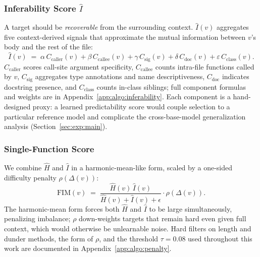 \subsubsection{Inferability Score $\hat{I}$}
\label{sec:method:inferability}

A target should be \emph{recoverable} from the surrounding context.
$\hat{I}(v)$ aggregates five context-derived signals that approximate
the mutual information between $v$'s body and the rest of the file:
\vspace{-0.5ex}
\begin{equation}
  \hat{I}(v) \;=\; \alpha\,C_{\mathrm{caller}}(v)
              + \beta\,C_{\mathrm{callee}}(v)
              + \gamma\,C_{\mathrm{sig}}(v)
              + \delta\,C_{\mathrm{doc}}(v)
              + \varepsilon\,C_{\mathrm{class}}(v).
  \label{eq:inferability}
\end{equation}
$C_{\mathrm{caller}}$ scores call-site argument specificity,
$C_{\mathrm{callee}}$ counts intra-file functions called by $v$,
$C_{\mathrm{sig}}$ aggregates type annotations and name descriptiveness,
$C_{\mathrm{doc}}$ indicates docstring presence, and
$C_{\mathrm{class}}$ counts in-class siblings; full component formulas
and weights are in Appendix~\ref{app:algo:inferability}. Each component
is a hand-designed proxy: a learned predictability score would couple
selection to a particular reference model and complicate the
cross-base-model generalization analysis (Section~\ref{sec:exp:main}).

\subsubsection{Single-Function Score}
\label{sec:method:single}

We combine $\hat{H}$ and $\hat{I}$ in a harmonic-mean-like form, scaled
by a one-sided difficulty penalty $\rho(\Delta(v))$:
\vspace{-0.5ex}
\begin{equation}
  \mathrm{FIM}(v) \;=\;
  \frac{\hat{H}(v)\,\hat{I}(v)}{\hat{H}(v) + \hat{I}(v) + \epsilon}
  \cdot \rho\!\left(\Delta(v)\right).
  \label{eq:fim_single}
\end{equation}
The harmonic-mean form forces both $\hat{H}$ and $\hat{I}$ to be large
simultaneously, penalizing imbalance; $\rho$ down-weights targets that
remain hard even given full context, which would otherwise be
unlearnable noise. Hard filters on length and dunder methods, the form
of $\rho$, and the threshold $\tau\!=\!0.08$ used throughout this work
are documented in Appendix~\ref{app:algo:penalty}.

